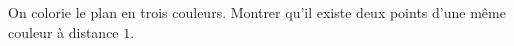 On colorie le plan en trois couleurs. Montrer qu'il existe deux points d'une même couleur à distance $1$.
